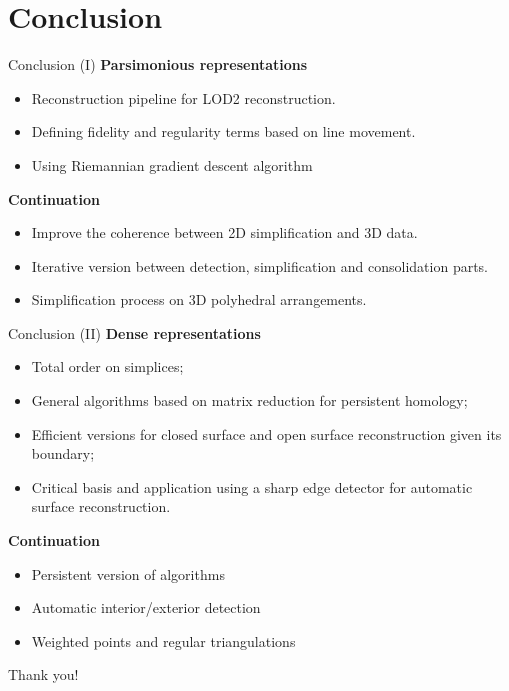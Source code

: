 \section{Conclusion}
\begin{frame}{Conclusion (I)}
\small
\textbf{Parsimonious representations}
\begin{itemize}
	\item<+-> Reconstruction pipeline for LOD2 reconstruction.
	\item<+-> Defining fidelity and regularity terms based on line movement.
	\item<+-> Using Riemannian gradient descent algorithm
\end{itemize}
	
\textbf{Continuation}
\begin{itemize}
	\item Improve the coherence between 2D simplification and 3D data.
	\item Iterative version between detection, simplification and consolidation parts.
	\item Simplification process on 3D polyhedral arrangements.
\end{itemize}

\end{frame}

\begin{frame}{Conclusion (II)}
\small
\textbf{Dense representations}
\begin{itemize}
	\item<+-> Total order on simplices;
	\item<+-> General algorithms based on matrix reduction for persistent homology;
	\item<+-> Efficient versions for closed surface and open surface reconstruction given its boundary;
	\item<+-> Critical basis and application using a sharp edge detector for automatic surface reconstruction.
\end{itemize}

\textbf{Continuation}
\begin{itemize}
	\item Persistent version of algorithms
	\item Automatic interior/exterior detection
	\item Weighted points and regular triangulations	
\end{itemize}

\end{frame}

\begin{frame}[standout]
	Thank you!
\end{frame}